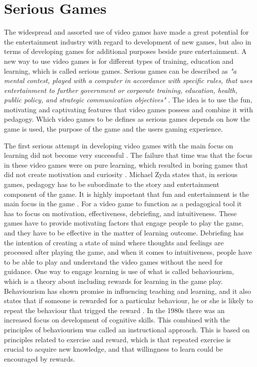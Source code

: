 \section{Serious Games}
\label{sec:sergames}
The widespread and assorted use of video games have made a great potential for the entertainment industry with regard to development of new games, but also in terms of developing games for additional purposes beside pure entertainment. A new way to use video games is for different types of training, education and learning, which is called serious games. Serious games can be described as \emph{"a mental contest, played with a computer in accordance with specific rules, that uses entertainment to further government or corporate training, education, health, public policy, and strategic communication objectives"} \cite{zyda2005visual}. The idea is to use the fun, motivating and captivating features that video games possess and combine it with pedagogy. Which video games to be defines as serious games depends on how the game is used, the purpose of the game and the users gaming experience. 

The first serious attempt in developing video games with the main focus on learning did not become very successful \cite{understandingvg}. The failure that time was that the focus in these  video games were on pure learning, which resulted in boring games that did not create motivation and curiosity \cite{understandingvg} \cite{susi2007serious}. Michael Zyda states that, in serious games, pedagogy has to be subordinate to the story and entertainment component of the game. It is highly important that fun and entertainment is the main focus in the game \cite{zyda2005visual}. For a video game to function as a pedagogical tool it has to focus on motivation, effectiveness, debriefing, and intuitiveness. These games have to provide motivating factors that engage people to play the game, and they have to be effective in the matter of learning outcome. Debriefing has the intention of creating a state of mind where thoughts and feelings are processed after playing the game, and when it comes to intuitiveness, people have to be able to play and understand the video games without the need for guidance. One way to engage learning is use of what is called behaviourism, which is a theory about including rewards for learning in the game play. Behaviourism has shown promise in influencing teaching and learning, and it also states that if someone is rewarded for a particular behaviour, he or she is likely to repeat the behaviour that trigged the reward \cite{behaviour}. In the 1980s there was an increased focus on development of cognitive skills. This combined with the principles of behaviourism was called an instructional approach. This is based on principles related to exercise and reward, which is that repeated exercise is crucial to acquire new knowledge, and that willingness to learn could be encouraged by rewards. 

